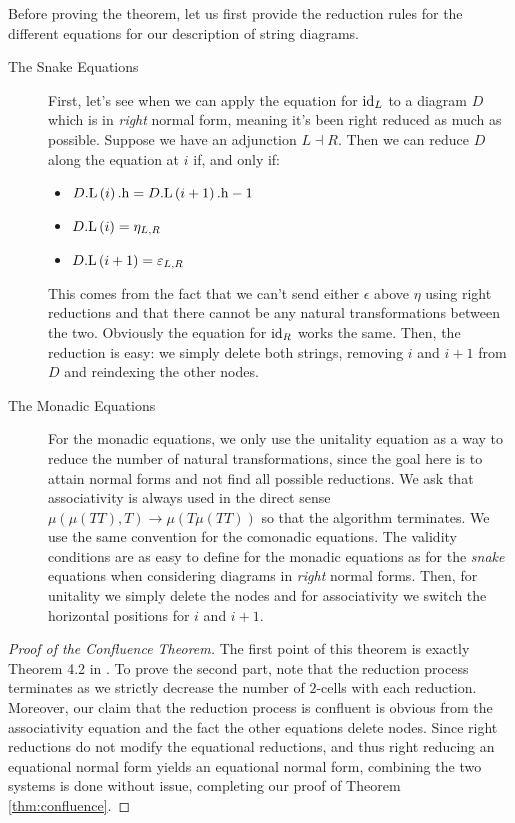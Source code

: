 Before proving the theorem, let us first provide the reduction rules for the
different equations for our description of string diagrams.
\begin{description}
	\item[The Snake Equations]
	      First, let's see when we can apply the equation for $\mathrm{id}_{L}$ to a
	      diagram $D$ which is in \emph{right} normal form, meaning it's been
	      right reduced as much as possible.
	      Suppose we have an adjunction $L \dashv R$.
	      Then we can reduce $D$ along the equation at $i$ if, and only if:
	      \begin{itemize}
		      \item $D\mathrm{.L}\left(i\right)\mathrm{.h} = D\mathrm{.L}\left(i + 1\right)\mathrm{.h} - 1$
		      \item $D\mathrm{.L}\left(i\right) = \eta_{L, R}$
		      \item $D\mathrm{.L}\left(i + 1\right) = \varepsilon_{L, R}$
	      \end{itemize}
	      This comes from the fact that we can't send either $\epsilon$
	      above $\eta$ using right reductions and
	      that there cannot be any natural transformations between the two.
	      Obviously the equation for $\mathrm{id}_{R}$ works the same.
	      Then, the reduction is easy: we simply delete both strings,
	      removing $i$ and $i + 1$ from $D$ and reindexing the other nodes.
	\item[The Monadic Equations] For the monadic equations, we only use
	      the unitality equation as a way to reduce the number of natural
	      transformations, since the goal here is to attain normal forms
	      and not find all possible reductions.
	      We ask that associativity is always used in the direct
	      sense $\mu\left( \mu\left( TT \right),T \right) \to \mu\left(
		      T\mu\left( TT \right) \right)$ so that the algorithm terminates.
	      We use the same convention for the comonadic equations.
	      The validity conditions are as easy to define for the monadic
	      equations as for the \emph{snake} equations when considering
	      diagrams in \emph{right} normal forms.
	      Then, for unitality we simply delete the nodes
	      and for associativity we switch the horizontal
	      positions for $i$ and $i + 1$.
\end{description}

\begin{proof}[Proof of the Confluence Theorem]
	The first point of this theorem is exactly Theorem 4.2
	in \cite{delpeuchNormalizationPlanarString2022}.
	To prove the second part, note that the reduction process terminates as
	we strictly decrease the number of $2$-cells with each reduction.
	Moreover, our claim that the reduction process is confluent is obvious
	from the associativity equation and the fact the other
	equations delete nodes.
	Since right reductions do not modify the equational reductions, and thus
	right reducing an equational normal form yields an equational normal form,
	combining the two systems is done without issue, completing our proof of
	Theorem \ref{thm:confluence}.
\end{proof}

